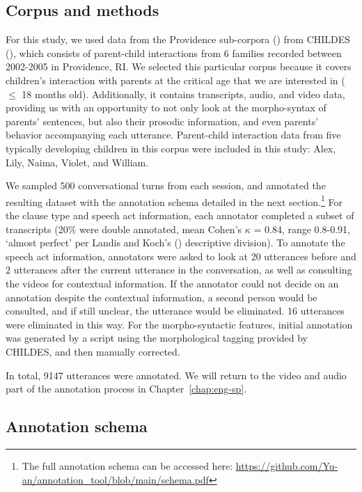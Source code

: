\subsection{Corpus and methods}
\label{sec:engcl:corpus:methods}
For this study, we used data from the Providence sub-corpora (\cite{ProvidenceCorpus}) from CHILDES (\cite{CHILDES}), which consists of parent-child interactions from 6 families recorded between 2002-2005 in Providence, RI. We selected this particular corpus because it covers children’s interaction with parents at the critical age that we are interested in ($\leq$ 18 months old). Additionally, it contains transcripts, audio, and video data, providing us with an opportunity to not only look at the morpho-syntax of parents’ sentences, but also their prosodic information, and even parents’ behavior accompanying each utterance. Parent-child interaction data from five typically developing children in this corpus were included in this study: Alex, Lily, Naima, Violet, and William. %

We sampled 500 conversational turns from each session, and annotated the resulting dataset with the annotation schema detailed in the next section.\footnote{The full annotation schema can be accessed here: \url{https://github.com/Yu-an/annotation_tool/blob/main/schema.pdf}} For the clause type and speech act information, each annotator completed a subset of transcripts (20\% were double annotated, mean Cohen's $\kappa$ = 0.84, range 0.8-0.91, `almost perfect’ per Landis and Koch's (\cite*{landis1977iaa}) descriptive division). To annotate the speech act information, annotators were asked to look at 20 utterances before and 2 utterances after the current utterance in the conversation, as well as consulting the videos for contextual information. If the annotator could not decide on an annotation despite the contextual information, a second person would be consulted, and if still unclear, the utterance would be eliminated. 16 utterances were eliminated in this way. For the morpho-syntactic features, initial annotation was generated by a script using the morphological tagging provided by CHILDES, and then manually corrected. 

In total, 9147 utterances were annotated. We will return to the video and audio part of the annotation process in Chapter~\ref{chap:eng-sp}.




\subsection{Annotation schema}
\label{sec:engcl:corpus:schema}


